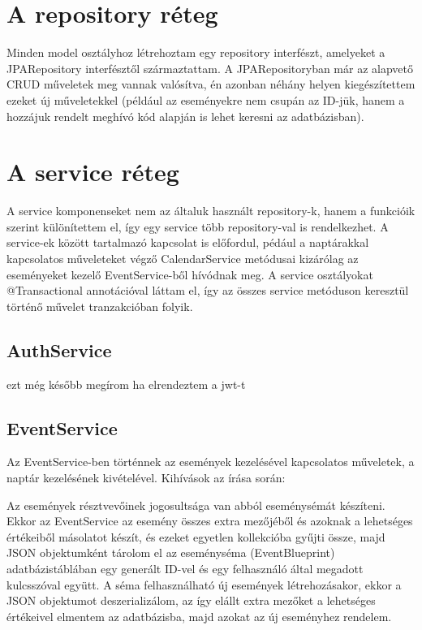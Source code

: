 \documentclass[a4paper,12pt]{report}
\theoremstyle{definition}
\theoremstyle{remark}
\begin{document}
\section{A repository réteg}

Minden model osztályhoz létrehoztam egy repository interfészt, amelyeket a JPARepository interfésztől származtattam. A JPARepositoryban már az alapvető CRUD műveletek meg vannak valósítva, én azonban néhány helyen kiegészítettem ezeket új műveletekkel (például az eseményekre nem csupán az ID-jük, hanem a hozzájuk rendelt meghívó kód alapján is lehet keresni az adatbázisban).

\section{A service réteg}

A service komponenseket nem az általuk használt repository-k, hanem a funkcióik szerint különítettem el, így egy service több repository-val is rendelkezhet. A service-ek között tartalmazó kapcsolat is előfordul, pédául a naptárakkal kapcsolatos műveleteket végző CalendarService metódusai kizárólag az eseményeket kezelő EventService-ből hívódnak meg. A service osztályokat @Transactional annotációval láttam el, így az összes service metóduson keresztül történő művelet tranzakcióban folyik.

\subsection{AuthService}

ezt még később megírom ha elrendeztem a jwt-t

\subsection{EventService}

Az EventService-ben történnek az események kezelésével kapcsolatos műveletek, a naptár kezelésének kivételével. Kihívások az írása során:

Az események résztvevőinek jogosultsága van abból eseménysémát készíteni. Ekkor az EventService az esemény összes extra mezőjéből és azoknak a lehetséges értékeiből másolatot készít, és ezeket egyetlen kollekcióba gyűjti össze, majd JSON objektumként tárolom el az eseményséma (EventBlueprint) adatbázistáblában egy generált ID-vel és egy felhasználó által megadott kulcsszóval együtt. A séma felhasználható új események létrehozásakor, ekkor a JSON objektumot deszerializálom, az így elállt extra mezőket a lehetséges értékeivel elmentem az adatbázisba, majd azokat az új eseményhez rendelem.
\end{document}
